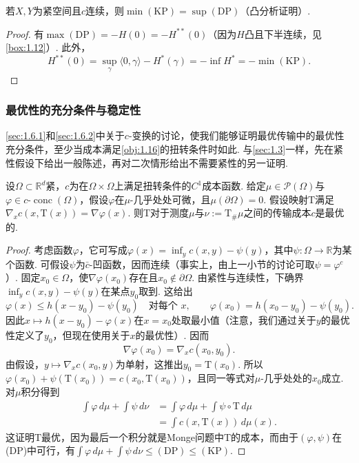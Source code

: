 \begin{theorem}\label{obj:1.46}
若$X,Y$为紧空间且$c$连续，则$\min(\mathrm{KP})=\sup(\mathrm{DP})$（凸分析证明）.
\end{theorem}
\begin{proof}
有$\max(\mathrm{DP})=-H(0)=-H^{**}(0)$（因为$H$凸且下半连续，见\autoref{box:1.12}）. 此外，
\[
H^{**}(0)=\sup_\gamma\langle0,\gamma\rangle-H^*(\gamma)
=-\inf H^*=-\min(\mathrm{KP}).
\]
\end{proof}

\subsubsection{最优性的充分条件与稳定性}\label{sec:1.6.4}

\autoref{sec:1.6.1}和\autoref{sec:1.6.2}中关于$c$-变换的讨论，使我们能够证明最优传输中的最优性充分条件，至少当成本满足\autoref{obj:1.16}的扭转条件时如此. 与\autoref{sec:1.3}一样，先在紧性假设下给出一般陈述，再对二次情形给出不需要紧性的另一证明.

\begin{theorem}\label{obj:1.47}
设$\Omega\subset\mathbb R^d$紧，$c$为在$\Omega\times\Omega$上满足扭转条件的$C^1$成本函数. 给定$\mu\in\mathscr P(\Omega)$与$\varphi\in c\text{-}\operatorname{conc}(\Omega)$，假设$\varphi$在$\mu$-几乎处处可微，且$\mu(\partial\Omega)=0$. 假设映射$\mathrm{T}$满足$\nabla_xc(x,\mathrm{T}(x))=\nabla\varphi(x)$. 则$\mathrm{T}$对于测度$\mu$与$\nu:=\mathrm{T}_\#\mu$之间的传输成本$c$是最优的.
\end{theorem}
\begin{proof}
考虑函数$\varphi$，它可写成$\varphi(x)=\inf_y c(x,y)-\psi(y)$，其中$\psi:\Omega\to\mathbb R$为某个函数. 可假设$\psi$为$\bar c$-凹函数，因而连续（事实上，由上一小节的讨论可取$\psi=\varphi^c$）. 固定$x_0\in\Omega$，使$\nabla\varphi(x_0)$存在且$x_0\notin\partial\Omega$. 由紧性与连续性，下确界$\inf_y c(x,y)-\psi(y)$在某点$y_0$取到. 这给出
\[
\varphi(x)\le h(x-y_0)-\psi(y_0)\quad\text{对每个 }x,
\qquad\varphi(x_0)=h(x_0-y_0)-\psi(y_0).
\]
因此$x\mapsto h(x-y_0)-\varphi(x)$在$x=x_0$处取最小值（注意，我们通过关于$y$的最优性定义了$y_0$，但现在使用关于$x$的最优性）. 因而
\[
\nabla\varphi(x_0)=\nabla_xc(x_0,y_0).
\]
由假设，$y\mapsto\nabla_xc(x_0,y)$为单射，这推出$y_0=\mathrm{T}(x_0)$. 所以$\varphi(x_0)+\psi(\mathrm{T}(x_0))=c(x_0,\mathrm{T}(x_0))$，且同一等式对$\mu$-几乎处处的$x_0$成立. 对$\mu$积分得到
\begin{equation*}
\begin{aligned}
\int\varphi\,d\mu+\int\psi\,d\nu
&=\int\varphi\,d\mu+\int\psi\circ \mathrm{T}\,d\mu\\
&=\int c(x,\mathrm{T}(x))\,d\mu(x).
\end{aligned}
\end{equation*}
这证明$\mathrm{T}$最优，因为最后一个积分就是Monge问题中$\mathrm{T}$的成本，而由于$(\varphi,\psi)$在(DP)中可行，有$\int\varphi\,d\mu+\int\psi\,d\nu\le(\mathrm{DP})\le(\mathrm{KP})$.
\end{proof}

